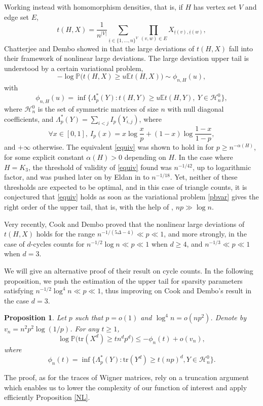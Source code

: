 \documentclass[aop,preprint]{imsart}
\newcommand\PP{\mathbb{P}}
\newcommand\EE{\mathbb{E}}
\newcommand\tr{\mathrm{tr}}
\numberwithin{equation}{section}
\theoremstyle{definition}
\theoremstyle{plain}
\newtheorem{Pro}[Def]{Proposition}
\theoremstyle{remark}
\begin{document}
Working instead with homomorphism densities, that is, if $H$ has vertex set $V$ and edge set $E$, 
$$ t(H,X) = \frac{1}{n^{|V|}} \sum_{ \underline{i} \in \{1,...,n\}^V} \prod_{(v,w) \in E} X_{\underline{i}(v), \underline{i}(w)},$$
Chatterjee and Dembo showed in \cite{CD} that the large deviations of $t(H,X)$ fall into their framework of nonlinear large deviations. The large deviation upper tail is understood by a certain variational problem,
\begin{equation} \label{equiv}  -\log \PP\big( t(H,X) \geq u \EE t(H,X) \big)  \sim \phi_{n,H}(u),\end{equation}
with
\begin{equation} \label{pbvar} \phi_{n,H}(u) = \inf \big\{ \Lambda^*_p(Y) : t(H,Y) \geq u \EE t(H,Y),  \ Y\in \mathcal{H}_n^0 \big\},\end{equation}
where $\mathcal{H}_n^0$ is the set of symmetric matrices of size $n$ with null diagonal coefficients, and  $\Lambda^*_p(Y) = \sum_{i<j} I_p(Y_{i,j})$, 
where $$\forall x \in [0,1], \ I_p(x) = x \log \frac{x}{p} +(1-x)\log \frac{1-x}{1-p},$$
 and $+\infty$ otherwise. The equivalent \eqref{equiv} was shown to hold in \cite[Theorem 1.2]{CD} for $p\geq n^{-\alpha(H)}$, for some explicit constant $\alpha(H) >0$ depending on $H$. In the case where $H=K_3$, the threshold of validity of \eqref{equiv} found was $n^{-1/42}$, up to logarithmic factor, and was pushed later on by Eldan in \cite{Eldan} to $n^{-1/18}$. Yet, neither of these thresholds are expected to be optimal, and in this case of triangle counts, it is conjectured that \eqref{equiv} holds as soon as the variational problem \eqref{pbvar} gives the right order of the upper tail, that is, with the help of \cite{LZ}, $n p\gg \log n$. 

Very recently, Cook and Dembo \cite{CoD} proved that the nonlinear large deviations of $t(H,X)$ holds for the range $n^{-1/(5\Delta -4)} \ll p \ll 1$, and more strongly, in the case of $d$-cycles counts for $n^{-1/2}  \log n \ll p \ll 1$ when $d\geq 4$, and $ n^{-1/3}   \ll p \ll 1$ when $d=3$. 

We will give an alternative proof of their result on cycle counts. In the following proposition, we push the estimation of the upper tail for sparsity parameters satisfying $n^{-1/2} \log^4 n \ll p \ll 1$, thus improving on Cook and Dembo's result in the case $d=3$.




\begin{Pro}\label{cycleup}
Let $p$ such that $p=o(1)$ and $\log^4n =o(np^2)$. Denote by  $v_n = n^2p^2 \log(1/p)$.
For any $t\geq 1$,
$$ \log\PP\big( \tr( X^d )\geq t n^dp^d \big) \leq -  \phi_n(t) + o(v_n),$$
where $$ \phi_n(t) = \inf \big\{ \Lambda^*_p(Y)  : \tr (Y^d) \geq t (np)^d, Y\in\mathcal{H}_n^0 \big\}.$$ 
\end{Pro}
The proof, as for the traces of Wigner matrices, rely on a truncation argument which enables us to  lower the complexity of our function of interest and apply efficiently Proposition \ref{NL}. 
\end{document}
